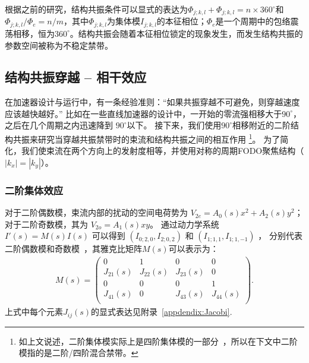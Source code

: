 根据之前的研究\cite{11,12}，结构共振条件可以显式的表达为$\Phi_{j;k,l}+\Phi_{j;k,l}=n\times 360^{\circ}$和$\Phi_{j;k,l}/\Phi_{e}=n/m$，其中$\Phi_{j;k,l}$为集体模$I_{j;k,l}$的本征相位；$\Phi_{e}$是一个周期中的包络震荡相移，恒为$360^{\circ}$。结构共振会随着本征相位锁定的现象发生，而发生结构共振的参数空间被称为不稳定禁带。

\subsection{结构共振穿越 -- 相干效应}
\label{section:Crossing_Coherent}
在加速器设计与运行中，有一条经验准则：“如果共振穿越不可避免，则穿越速度应该越快越好。”
比如在一些直线加速器的设计中，一开始的零流强相移大于$90^{\circ}$，之后在几个周期之内迅速降到 $90^{\circ}$以下。
接下来，我们使用$90^{\circ}$相移附近的二阶结构共振来研究当穿越共振禁带时的束流和结构共振之间的相互作用
\footnote{如上文说述，二阶集体模实际上是四阶集体模的一部分~\cite{12}，所以在下文中二阶模指的是二阶/四阶混合禁带。}。
为了简化，我们使束流在两个方向上的发射度相等，并使用对称的周期FODO聚焦结构（$|k_x|=|k_y|$）。

\subsubsection{二阶集体效应}
对于二阶偶数模，束流内部的扰动的空间电荷势为  $V_{2e} = A_0(s)x^2 + A_2(s)y^2$；
对于二阶奇数模，其为 $V_{2o}=A_1(s)xy$。
通过动力学系统 $I'(s)=M(s)I(s)$ 可以得到 $(I_{0;2,0}, I_{2;0,2})$ 和  $(I_{1;1,1}, I_{1;1,-1})$ ，
分别代表二阶偶数模和奇数模~\cite{11, 12, 18}，其雅克比矩阵$M(s)$可以表示为：
\begin{eqnarray}\label{eq2.5}
M(s)=
\left(
  \begin{array}{cccc}
    0         & 1         & 0         & 0         \\
    J_{21}(s) & J_{22}(s) & J_{23}(s) & 0         \\
    0         & 0         & 0         & 1         \\
    J_{41}(s) & 0         & J_{43}(s) & J_{44}(s) \\
  \end{array}
\right).
\end{eqnarray}
上式中每个元素$J_{ij}(s)$的显式表达见附录~\ref{appdendix:Jacobi}.

